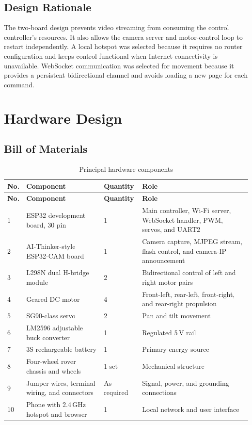 \documentclass[12pt,a4paper,oneside]{report}
\begin{document}
\section{Design Rationale}
The two-board design prevents video streaming from consuming the control
controller's resources. It also allows the camera server and motor-control loop
to restart independently. A local hotspot was selected because it requires no
router configuration and keeps control functional when Internet connectivity is
unavailable. WebSocket communication was selected for movement because it
provides a persistent bidirectional channel and avoids loading a new page for
each command.

\chapter{Hardware Design}
\label{ch:hardware}

\section{Bill of Materials}
\begin{longtable}{p{0.8cm}p{4.3cm}p{2.0cm}p{7.2cm}}
  \caption{Principal hardware components}
  \label{tab:bom}\\
  \toprule
  \textbf{No.} & \textbf{Component} & \textbf{Quantity} & \textbf{Role} \\
  \midrule
  \endfirsthead
  \toprule
  \textbf{No.} & \textbf{Component} & \textbf{Quantity} & \textbf{Role} \\
  \midrule
  \endhead
  1 & ESP32 development board, 30 pin & 1 & Main controller, Wi-Fi server, WebSocket handler, PWM, servos, and UART2 \\
  2 & AI-Thinker-style ESP32-CAM board & 1 & Camera capture, MJPEG stream, flash control, and camera-IP announcement \\
  3 & L298N dual H-bridge module & 2 & Bidirectional control of left and right motor pairs \\
  4 & Geared DC motor & 4 & Front-left, rear-left, front-right, and rear-right propulsion \\
  5 & SG90-class servo & 2 & Pan and tilt movement \\
  6 & LM2596 adjustable buck converter & 1 & Regulated 5\,V rail \\
  7 & 3S rechargeable battery & 1 & Primary energy source \\
  8 & Four-wheel rover chassis and wheels & 1 set & Mechanical structure \\
  9 & Jumper wires, terminal wiring, and connectors & As required & Signal, power, and grounding connections \\
  10 & Phone with 2.4\,GHz hotspot and browser & 1 & Local network and user interface \\
  \bottomrule
\end{longtable}
\end{document}
